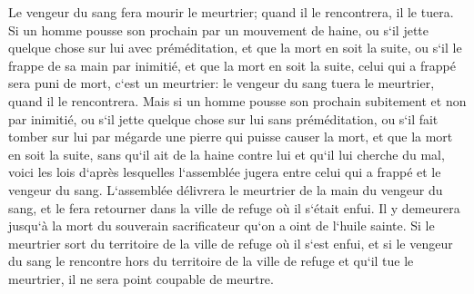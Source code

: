 \verse Le vengeur du sang fera mourir le meurtrier; quand il le rencontrera, il le tuera. 
\verse Si un homme pousse son prochain par un mouvement de haine, ou s`il jette quelque chose sur lui avec préméditation, et que la mort en soit la suite, 
\verse ou s`il le frappe de sa main par inimitié, et que la mort en soit la suite, celui qui a frappé sera puni de mort, c`est un meurtrier: le vengeur du sang tuera le meurtrier, quand il le rencontrera. 
\verse Mais si un homme pousse son prochain subitement et non par inimitié, ou s`il jette quelque chose sur lui sans préméditation, 
\verse ou s`il fait tomber sur lui par mégarde une pierre qui puisse causer la mort, et que la mort en soit la suite, sans qu`il ait de la haine contre lui et qu`il lui cherche du mal, 
\verse voici les lois d`après lesquelles l`assemblée jugera entre celui qui a frappé et le vengeur du sang. 
\verse L`assemblée délivrera le meurtrier de la main du vengeur du sang, et le fera retourner dans la ville de refuge où il s`était enfui. Il y demeurera jusqu`à la mort du souverain sacrificateur qu`on a oint de l`huile sainte. 
\verse Si le meurtrier sort du territoire de la ville de refuge où il s`est enfui, 
\verse et si le vengeur du sang le rencontre hors du territoire de la ville de refuge et qu`il tue le meurtrier, il ne sera point coupable de meurtre. 
